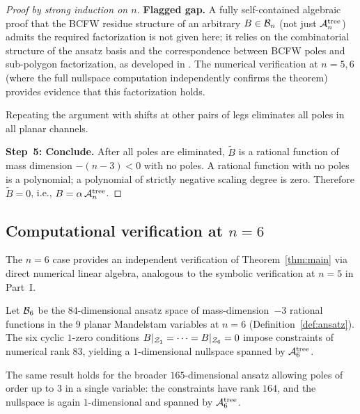 \begin{proof}[Proof by strong induction on $n$]
\textbf{Flagged gap.} A fully self-contained algebraic
proof that the BCFW residue structure of an arbitrary
$B \in \mathcal{B}_n$ (not just $\mathcal{A}_n^{\mathrm{tree}}$)
admits the required factorization is not given here;
it relies on the combinatorial structure of the ansatz
basis and the correspondence between BCFW poles and
sub-polygon factorization, as developed in
\cite[Sec.~3]{Rodina2024}. The numerical verification
at $n = 5, 6$ (where the full nullspace computation
independently confirms the theorem) provides evidence
that this factorization holds.

Repeating the argument with shifts at other pairs of
legs eliminates all poles in all planar channels.

\medskip
\noindent\textbf{Step~5: Conclude.}
After all poles are eliminated, $\widetilde{B}$ is a rational
function of mass dimension $-(n-3) < 0$ with no poles.
A rational function with no poles is a polynomial; a
polynomial of strictly negative scaling degree is zero.
Therefore $\widetilde{B} = 0$, i.e., $B = \alpha\,
\mathcal{A}_n^{\mathrm{tree}}$.
\end{proof}

\subsection{Computational verification at $n = 6$}
\label{ssec:n6}

The $n = 6$ case provides an independent verification of
Theorem~\ref{thm:main} via direct numerical linear algebra,
analogous to the symbolic verification at $n = 5$ in Part~I.

\begin{proposition}[Numerical verification, $n = 6$]
\label{prop:n6}
Let $\mathcal{B}_6$ be the $84$-dimensional ansatz space of
mass-dimension~$-3$ rational functions in the $9$ planar
Mandelstam variables at $n = 6$ (Definition~\ref{def:ansatz}).
The six cyclic $1$-zero conditions
$B|_{\mathcal{Z}_1} = \cdots = B|_{\mathcal{Z}_6} = 0$ impose constraints
of numerical rank $83$, yielding a $1$-dimensional
nullspace spanned by $\mathcal{A}_6^{\mathrm{tree}}$.

The same result holds for the broader $165$-dimensional
ansatz allowing poles of order up to $3$ in a single
variable: the constraints have rank $164$, and the
nullspace is again $1$-dimensional and spanned by
$\mathcal{A}_6^{\mathrm{tree}}$.
\end{proposition}

